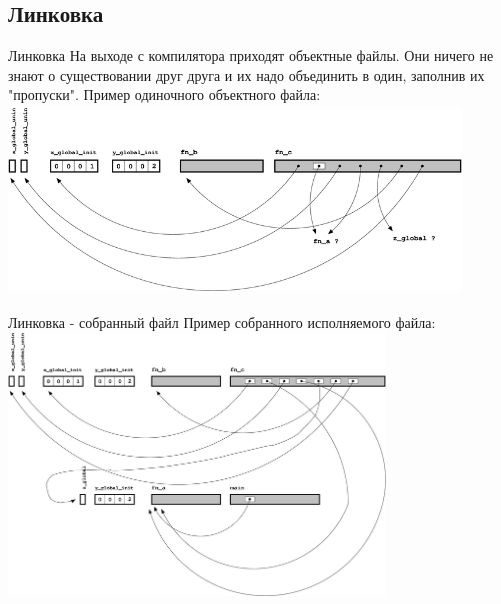 \documentclass[10pt]{beamer}
\begin{document}
\subsection{Линковка}
\begin{frame}[fragile]{Линковка}
На выходе с компилятора приходят объектные файлы. Они ничего не знают о существовании друг друга и их надо объединить в один, заполнив их "пропуски". Пример одиночного объектного файла:
 \includegraphics[width=12cm, height=5cm]{Term_3/Source/Pictures/c_parts.png}
\end{frame}

\begin{frame}[fragile]{Линковка - собранный файл}
Пример собранного исполняемого файла:
 \includegraphics[width=10cm, height=7cm]{Term_3/Source/Pictures/c_parts_linked.png}
\end{frame}
\end{document}
